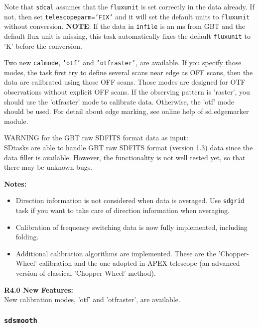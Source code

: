 Note that {\tt sdcal} assumes that the {\tt fluxunit} is set correctly in
the data already.  If not, then set {\tt telescopeparm='FIX'} and it
will set the default units to {\tt fluxunit} without conversion.
{\bf NOTE}: If the data in {\tt infile} is an ms from GBT and the default flux
unit is missing, this task automatically fixes the default {\tt fluxunit}
to 'K' before the conversion.

Two new {\tt calmode}, {\tt 'otf'} and {\tt 'otfraster'}, are available. If you 
specify those modes, the task first try to define several scans 
near edge as OFF scans, then the data are calibrated using those 
OFF scans. Those modes are designed for OTF observations without 
explicit OFF scans. If the observing pattern is 'raster', you 
should use the 'otfraster' mode to calibrate data. Otherwise, the 
'otf' mode should be used. For detail about edge marking, see 
online help of sd.edgemarker module.

WARNING for the GBT raw SDFITS format data as input:\\
SDtasks are able to handle GBT raw SDFITS format (version 1.3) data since the 
data filler is available. However, the functionality is not well 
tested yet, so that there may be unknown bugs. 

{\bf Notes:}
 \begin{itemize}
  \item Direction information is not considered when data is averaged. 
Use {\tt sdgrid} task if you want to take care of direction information 
when averaging.
  \item Calibration of frequency switching data is now fully implemented, including folding.
  \item Additional calibration algorithms are implemented. These are the
'Chopper-Wheel' calibration and the one adopted in APEX telescope (an advanced version of classical 'Chopper-Wheel' method). 
\end{itemize}

\medskip
{\bf R4.0 New Features:}\\
New calibration modes, 'otf' and 'otfraster', are available.

\subsubsection{{\tt sdsmooth}}
\label{section:sd.sdtasks.tasks.sdsmooth}

